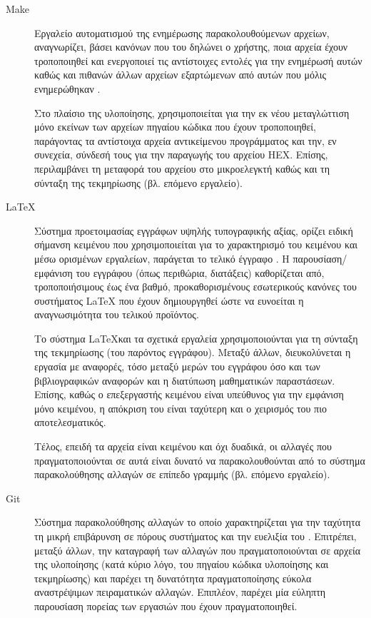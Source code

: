 \begin{description}

\item[Make]
Εργαλείο αυτοματισμού της ενημέρωσης παρακολουθούμενων αρχείων, αναγνωρίζει,
βάσει κανόνων που του δηλώνει ο χρήστης, ποια αρχεία έχουν τροποποιηθεί και
ενεργοποιεί τις αντίστοιχες εντολές για την ενημέρωσή αυτών καθώς και πιθανών
άλλων αρχείων εξαρτώμενων από αυτών που μόλις ενημερώθηκαν
\parencite{make:intro}.

Στο πλαίσιο της
υλοποίησης, χρησιμοποιείται για την εκ νέου μεταγλώττιση μόνο εκείνων των
αρχείων πηγαίου κώδικα που έχουν τροποποιηθεί, παράγοντας τα αντίστοιχα αρχεία
αντικείμενου προγράμματος και την, εν συνεχεία, σύνδεσή τους για την παραγωγής
του αρχείου HEX. Επίσης, περιλαμβάνει τη μεταφορά του αρχείου στο μικροελεγκτή
καθώς και τη σύνταξη της τεκμηρίωσης (βλ. επόμενο εργαλείο).


\item[\LaTeX]
Σύστημα προετοιμασίας εγγράφων υψηλής τυπογραφικής αξίας, ορίζει ειδική σήμανση
κειμένου που χρησιμοποιείται για το χαρακτηρισμό του κειμένου και μέσω ορισμένων
εργαλείων, παράγεται το τελικό έγγραφο \parencite{latex}. Η παρουσίαση\slash{}%
εμφάνιση του εγγράφου (όπως περιθώρια, διατάξεις) καθορίζεται από,
τροποποιήσιμους έως ένα βαθμό, προκαθορισμένους εσωτερικούς κανόνες του
συστήματος \LaTeX{}  που έχουν δημιουργηθεί ώστε να ευνοείται η αναγνωσιμότητα
του τελικού προϊόντος.

Το σύστημα \LaTeX και τα σχετικά εργαλεία χρησιμοποιούνται για τη σύνταξη της
τεκμηρίωσης (του παρόντος εγγράφου). Μεταξύ άλλων, διευκολύνεται η εργασία με
αναφορές, τόσο μεταξύ μερών του εγγράφου όσο και των βιβλιογραφικών αναφορών και
η διατύπωση μαθηματικών παραστάσεων. Επίσης, καθώς ο επεξεργαστής κειμένου είναι
υπεύθυνος για την εμφάνιση μόνο κειμένου, η απόκριση του είναι ταχύτερη και ο
χειρισμός του πιο αποτελεσματικός.

Τέλος, επειδή τα αρχεία είναι κειμένου και όχι δυαδικά, οι αλλαγές που
πραγματοποιούνται σε αυτά είναι δυνατό να παρακολουθούνται από το σύστημα
παρακολούθησης αλλαγών σε επίπεδο γραμμής (βλ. επόμενο εργαλείο).

\item[Git]
Σύστημα παρακολούθησης αλλαγών το οποίο χαρακτηρίζεται για την ταχύτητα
τη μικρή επιβάρυνση σε πόρους συστήματος και την ευελιξία του \parencite{git}.
Επιτρέπει, μεταξύ άλλων, την καταγραφή των αλλαγών που πραγματοποιούνται σε
αρχεία της υλοποίησης (κατά κύριο λόγο, του πηγαίου κώδικα υλοποίησης και
τεκμηρίωσης) και παρέχει τη δυνατότητα πραγματοποίησης εύκολα αναστρέψιμων
πειραματικών αλλαγών.
Επιπλέον, παρέχει μία εύληπτη παρουσίαση πορείας των εργασιών που έχουν
πραγματοποιηθεί.


\end{description}

